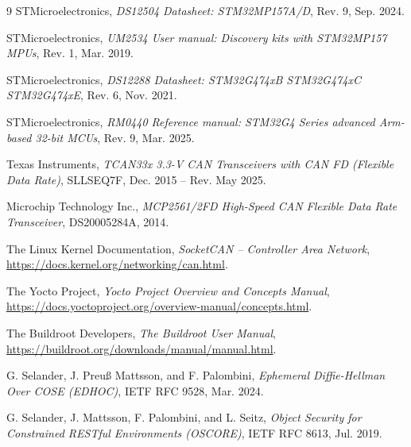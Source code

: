 \documentclass[12pt,a4paper]{article}
\begin{document}

\tableofcontents
\newpage



\begin{thebibliography}{9}
STMicroelectronics, \textit{DS12504 Datasheet: STM32MP157A/D}, Rev. 9, Sep. 2024.

STMicroelectronics, \textit{UM2534 User manual: Discovery kits with STM32MP157 MPUs}, Rev. 1, Mar. 2019.

STMicroelectronics, \textit{DS12288 Datasheet: STM32G474xB STM32G474xC STM32G474xE}, Rev. 6, Nov. 2021.

STMicroelectronics, \textit{RM0440 Reference manual: STM32G4 Series advanced Arm-based 32-bit MCUs}, Rev. 9, Mar. 2025.

Texas Instruments, \textit{TCAN33x 3.3-V CAN Transceivers with CAN FD (Flexible Data Rate)}, SLLSEQ7F, Dec. 2015 -- Rev. May 2025.

Microchip Technology Inc., \textit{MCP2561/2FD High-Speed CAN Flexible Data Rate Transceiver}, DS20005284A, 2014.

The Linux Kernel Documentation, \textit{SocketCAN -- Controller Area Network}, \url{https://docs.kernel.org/networking/can.html}.

The Yocto Project, \textit{Yocto Project Overview and Concepts Manual}, \url{https://docs.yoctoproject.org/overview-manual/concepts.html}.

The Buildroot Developers, \textit{The Buildroot User Manual}, \url{https://buildroot.org/downloads/manual/manual.html}.

G. Selander, J. Preuß Mattsson, and F. Palombini, \textit{Ephemeral Diffie-Hellman Over COSE (EDHOC)}, IETF RFC 9528, Mar. 2024.

G. Selander, J. Mattsson, F. Palombini, and L. Seitz, \textit{Object Security for Constrained RESTful Environments (OSCORE)}, IETF RFC 8613, Jul. 2019.
\end{thebibliography}
\end{document}
